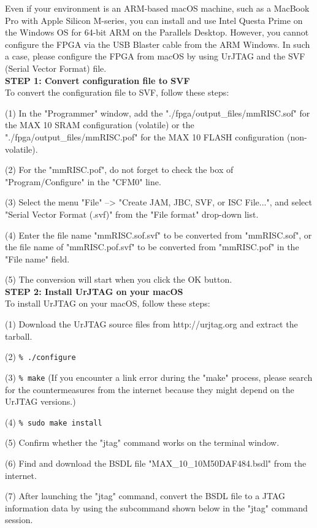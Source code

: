 Even if your environment is an ARM-based macOS machine, such as a MacBook Pro with Apple Silicon M-series, you can install and use Intel Questa Prime on the Windows OS for 64-bit ARM on the Parallels Desktop. However, you cannot configure the FPGA via the USB Blaster cable from the ARM Windows. In such a case, please configure the FPGA from macOS by using UrJTAG and the SVF (Serial Vector Format) file.\\

\textbf{STEP 1: Convert configuration file to SVF}\\
To convert the configuration file to SVF, follow these steps:

(1) In the "Programmer" window, add the "./fpga/output\_files/mmRISC.sof" for the MAX 10 SRAM configuration (volatile) or the "./fpga/output\_files/mmRISC.pof" for the MAX 10 FLASH configuration (non-volatile).

(2) For the "mmRISC.pof", do not forget to check the box of "Program/Configure" in the "CFM0" line.

(3) Select the menu "File" --> "Create JAM, JBC, SVF, or ISC File...", and select "Serial Vector Format (.svf)" from the "File format" drop-down list.

(4) Enter the file name "mmRISC.sof.svf" to be converted from "mmRISC.sof", or the file name of "mmRISC.pof.svf" to be converted from "mmRISC.pof" in the "File name" field.

(5) The conversion will start when you click the OK button.\\

\textbf{STEP 2: Install UrJTAG on your macOS}\\
To install UrJTAG on your macOS, follow these steps:

(1) Download the UrJTAG source files from http://urjtag.org and extract the tarball.

(2) \texttt{\% ./configure}

(3) \texttt{\% make} (If you encounter a link error during the "make" process, please search for the countermeasures from the internet because they might depend on the UrJTAG versions.)

(4) \texttt{\% sudo make install}

(5) Confirm whether the "jtag" command works on the terminal window.

(6) Find and download the BSDL file "MAX\_10\_10M50DAF484.bsdl" from the internet.

(7) After launching the "jtag" command, convert the BSDL file to a JTAG information data by using the subcommand shown below in the "jtag" command session.

